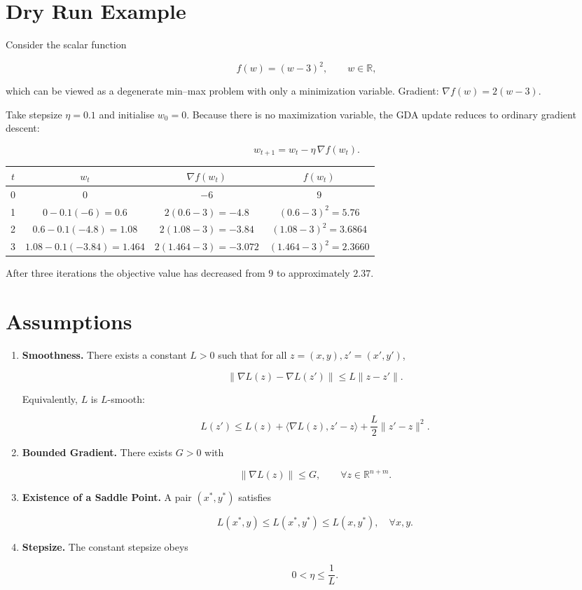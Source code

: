 \section*{Dry Run Example}
Consider the scalar function  

\[
f(w)= (w-3)^{2},\qquad w\in\mathbb R,
\]

which can be viewed as a degenerate min–max problem with only a minimization variable.  
Gradient: \(\nabla f(w)=2(w-3)\).

Take stepsize \(\eta=0.1\) and initialise \(w_{0}=0\).  
Because there is no maximization variable, the GDA update reduces to ordinary gradient descent:

\[
w_{t+1}=w_{t}-\eta\,\nabla f(w_{t}).
\]

\begin{center}
\begin{tabular}{c|c|c|c}
$t$ & $w_{t}$ & $\nabla f(w_{t})$ & $f(w_{t})$ \\ \hline
0 & $0$ & $-6$ & $9$ \\
1 & $0-0.1(-6)=0.6$ & $2(0.6-3)=-4.8$ & $(0.6-3)^{2}=5.76$ \\
2 & $0.6-0.1(-4.8)=1.08$ & $2(1.08-3)=-3.84$ & $(1.08-3)^{2}=3.6864$ \\
3 & $1.08-0.1(-3.84)=1.464$ & $2(1.464-3)=-3.072$ & $(1.464-3)^{2}=2.3660$ \\
\end{tabular}
\end{center}
After three iterations the objective value has decreased from \(9\) to approximately \(2.37\).

\newpage
\section*{Assumptions}
\begin{enumerate}
\item \textbf{Smoothness.} There exists a constant \(L>0\) such that for all \(z=(x,y),z'=(x',y')\),

\[
\bigl\|\nabla L(z)-\nabla L(z')\bigr\|\le L\|z-z'\|.
\tag{2}
\]

Equivalently, \(L\) is \(L\)-smooth:

\[
L(z')\le L(z)+\langle\nabla L(z),z'-z\rangle+\frac{L}{2}\|z'-z\|^{2}.
\tag{3}
\]

\item \textbf{Bounded Gradient.} There exists \(G>0\) with  

\[
\|\nabla L(z)\|\le G,\qquad\forall z\in\mathbb R^{n+m}.
\tag{4}
\]

\item \textbf{Existence of a Saddle Point.} A pair \((x^{*},y^{*})\) satisfies  

\[
L(x^{*},y)\le L(x^{*},y^{*})\le L(x,y^{*}),\quad\forall x,y.
\tag{5}
\]

\item \textbf{Stepsize.} The constant stepsize obeys  

\[
0<\eta\le\frac{1}{L}.
\tag{6}
\]
\end{enumerate}

